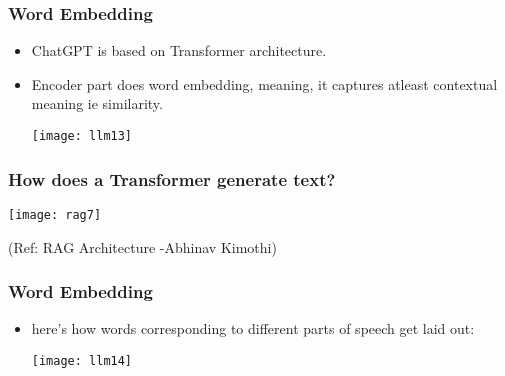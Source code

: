 \begin{frame}[fragile]\frametitle{Word Embedding}

\begin{itemize}
\item ChatGPT is based on Transformer architecture.
\item Encoder part does word embedding, meaning, it captures atleast contextual meaning ie similarity.

\begin{center}
\texttt{[image: llm13]}
\end{center}

\end{itemize}

\end{frame}

\begin{frame}[fragile]\frametitle{How does a Transformer generate text?}


		\begin{center}
		\texttt{[image: rag7]}
		\end{center}

{\tiny (Ref: RAG Architecture -Abhinav  Kimothi)}

\end{frame}


\begin{frame}[fragile]\frametitle{Word Embedding}

\begin{itemize}

\item here’s how words corresponding to different parts of speech get laid out:

\begin{center}
\texttt{[image: llm14]}
\end{center}

\end{itemize}

\end{frame}



